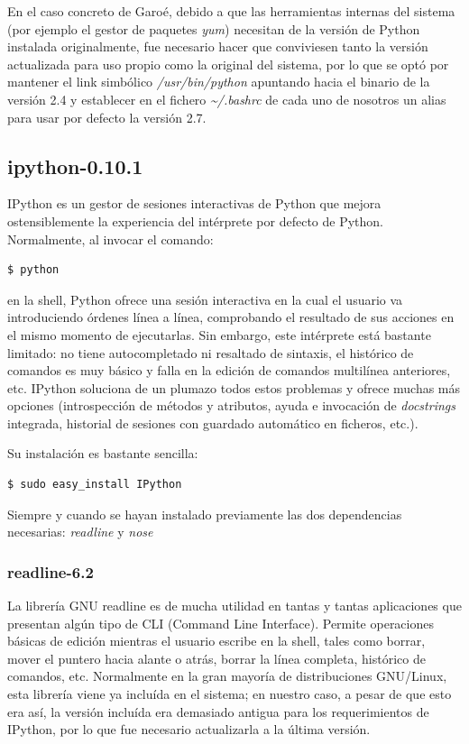 \documentclass[twoside]{article}
\begin{document}
\vspace{5 mm}

En el caso concreto de Garoé, debido a que las herramientas internas del sistema (por ejemplo el gestor de paquetes \emph{yum}) necesitan de la versión de Python instalada originalmente, fue necesario hacer que conviviesen tanto la versión actualizada para uso propio como la original del sistema, por lo que se optó por mantener el link simbólico \emph{/usr/bin/python} apuntando hacia el binario de la versión 2.4 y establecer en el fichero \emph{\textasciitilde/.bashrc} de cada uno de nosotros un alias para usar por defecto la versión 2.7.

\subsection{ipython-0.10.1}
IPython es un gestor de sesiones interactivas de Python que mejora ostensiblemente la experiencia del intérprete por defecto de Python. Normalmente, al invocar el comando:\begin{verbatim}$ python\end{verbatim} en la shell, Python ofrece una sesión interactiva en la cual el usuario va introduciendo órdenes línea a línea, comprobando el resultado de sus acciones en el mismo momento de ejecutarlas. Sin embargo, este intérprete está bastante limitado: no tiene autocompletado ni resaltado de sintaxis, el histórico de comandos es muy básico y falla en la edición de comandos multilínea anteriores, etc. IPython soluciona de un plumazo todos estos problemas y ofrece muchas más opciones (introspección de métodos y atributos, ayuda e invocación de \emph{docstrings} integrada, historial de sesiones con guardado automático en ficheros, etc.).

\vspace{5 mm}

Su instalación es bastante sencilla:

\begin{verbatim}
$ sudo easy_install IPython
\end{verbatim}

Siempre y cuando se hayan instalado previamente las dos dependencias necesarias: \emph{readline} y \emph{nose}

\subsubsection{readline-6.2}

La librería GNU readline es de mucha utilidad en tantas y tantas aplicaciones que presentan algún tipo de CLI (Command Line Interface). Permite operaciones básicas de edición mientras el usuario escribe en la shell, tales como borrar, mover el puntero hacia alante o atrás, borrar la línea completa, histórico de comandos, etc. Normalmente en la gran mayoría de distribuciones GNU/Linux, esta librería viene ya incluída en el sistema; en nuestro caso, a pesar de que esto era así, la versión incluída era demasiado antigua para los requerimientos de IPython, por lo que fue necesario actualizarla a la última versión.
\end{document}
